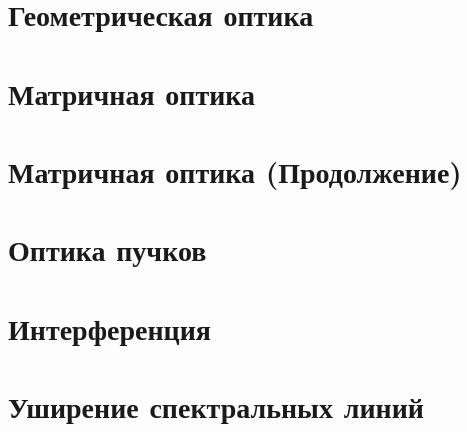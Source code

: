 


\section{Геометрическая оптика}

\newpage 

\section{Матричная оптика}


\section{Матричная оптика (Продолжение)}


\section{Оптика пучков}


\section{Интерференция}


\section{Уширение спектральных линий}



